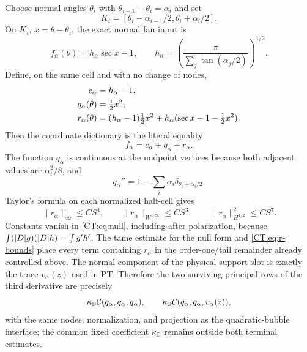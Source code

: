 Choose normal angles $\theta_i$ with
$\theta_{i+1}-\theta_i=\alpha_i$ and set
\begin{equation}\label{CT:eq:cells}
 K_i=[\theta_i-\alpha_{i-1}/2,\theta_i+\alpha_i/2].
\end{equation}
On $K_i$, $x=\theta-\theta_i$, the exact normal fan input is
\begin{equation}\label{CT:eq:secant}
 f_\alpha(\theta)=h_\alpha\sec x-1,
 \qquad
 h_\alpha=\left(\frac{\pi}{\sum_j\tan(\alpha_j/2)}\right)^{1/2}.
\end{equation}
Define, on the same cell and with no change of nodes,
\begin{align}
 c_\alpha&=h_\alpha-1,\notag\\
 q_\alpha(\theta)&=\tfrac12x^2,\label{CT:eq:bubble}\\
 r_\alpha(\theta)&=(h_\alpha-1)\tfrac12x^2
 +h_\alpha(\sec x-1-\tfrac12x^2).\notag
\end{align}
Then the coordinate dictionary is the literal equality
\begin{equation}\label{CT:eq:dictionary}
 \boxed{f_\alpha=c_\alpha+q_\alpha+r_\alpha.}
\end{equation}
The function $q_\alpha$ is continuous at the midpoint vertices because
both adjacent values are $\alpha_i^2/8$, and
\begin{equation}\label{CT:eq:q-distribution}
 q_\alpha''=1-\sum_i\alpha_i
 \delta_{\theta_i+\alpha_i/2}.
\end{equation}
Taylor's formula on each normalized half-cell gives
\begin{equation}\label{CT:eq:r-bounds}
 \|r_\alpha\|_\infty\le CS^4,\qquad
 \|r_\alpha\|_{W^{1,\infty}}\le CS^3,\qquad
 \|r_\alpha\|_{H^{1/2}}^2\le CS^7.
\end{equation}
Constants vanish in \eqref{CT:eq:null}, including after polarization, because
$\int(|D| g)(|D| h)=\int g'h'$.  The tame estimate for the null form and
\eqref{CT:eq:r-bounds} place every term containing $r_\alpha$ in the
order-one/tail remainder already controlled above.  The normal component
of the physical support slot is exactly the trace $v_\alpha(z)$ used in
PT.  Therefore the two surviving principal rows of the third derivative
are precisely
\begin{equation}\label{CT:eq:terminal-rows}
 \kappa_{\mathbb D}\mathcal C(q_\alpha,q_\alpha,q_\alpha),
 \qquad
 \kappa_{\mathbb D}\mathcal C(q_\alpha,q_\alpha,v_\alpha(z)),
\end{equation}
with the same nodes, normalization, and projection as the quadratic-bubble
interface; the common fixed coefficient $\kappa_{\mathbb D}$ remains
outside both terminal estimates.

